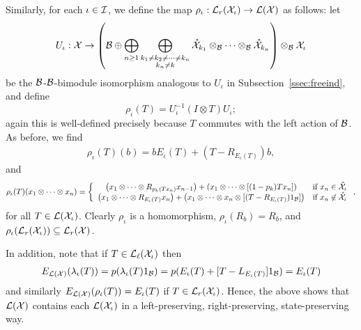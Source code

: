 \begin{construction}
	Similarly, for each $\iota \in \mathcal{I}$, we define the map $\rho_{\iota} : \mathcal{L}_r(\mathcal{X}_{\iota}) \to \mathcal{L}(\mathcal{X})$ as follows:
	let
	\[
		U_{\iota} : \mathcal{X} \to \left(\mathcal{B}\oplus\bigoplus_{n\geq1}\bigoplus_{\substack{k_1\neq k_2\neq\cdots\neq k_n\\ k_n \neq k}}
		\mathring{\mathcal{X}}_{k_1}\otimes_{\mathcal{B}}\cdots\otimes_{\mathcal{B}}\mathring{\mathcal{X}}_{k_n}\right) \otimes_{\mathcal{B}} \mathcal{X}_{\iota}
	\]
	be the $\mathcal{B}$-$\mathcal{B}$-bimodule isomorphism analogous to $U_\iota$ in Subsection~\ref{ssec:freeind}, and define
	\[
		\rho_{\iota}(T) = U_{\iota}^{-1}(I \otimes T)U_{\iota};
	\]
	again this is well-defined precisely because $T$ commutes with the left action of $\mathcal{B}$.
	As before, we find
	\begin{align*}
		\rho_{\iota}(T)(b) = b E_{\iota}(T) + (T-R_{E_{\iota}(T)}) b,
	\end{align*}
	and
	\begin{align*}
		\rho_{\iota}(T)(x_1\otimes\cdots \otimes x_n)=\left\{
			\begin{array}{cl}
				\left(x_1\otimes\cdots\otimes R_{p_{k}(T x_n)}x_{n-1}\right)
				+ \left(x_1\otimes\cdots \otimes [(1-p_{k})Tx_n]\right) & \text{if }x_n\in \mathring{\mathcal{X}}_{\iota}\\
				\left(x_1\otimes\cdots\otimes R_{E_{\iota}(T)}x_n\right)
				+ \left(x_1\otimes\cdots\otimes x_n\otimes [(T-R_{E_{\iota}(T)})1_{\mathcal{B}}]\right) & \text{if }x_n\not\in\mathring{\mathcal{X}}_{\iota}
		\end{array}\right.,
	\end{align*}
	for all $T \in \mathcal{L}(\mathcal{X}_{\iota})$.
	Clearly $\rho_{\iota}$ is a homomorphism, $\rho_{\iota}(R_b)=R_b$, and $\rho_{\iota}(\mathcal{L}_r(\mathcal{X}_{\iota})) \subseteq \mathcal{L}_r(\mathcal{X})$.




	In addition, note that if $T \in \mathcal{L}_\ell(\mathcal{X}_{\iota})$ then
	\begin{align*}
		E_{\mathcal{L}(\mathcal{X})}(\lambda_{\iota}(T))=p(\lambda_{\iota}(T)1_{\mathcal{B}})= p( E_{\iota}(T)+ [T-L_{E_{\iota}(T)}]1_{\mathcal{B}} ) = E_{\iota}(T)
	\end{align*}
	and similarly $E_{\mathcal{L}(\mathcal{X})}(\rho_{\iota}(T)) = E_{\iota}(T)$ if $T \in \mathcal{L}_r(\mathcal{X}_\iota)$.
	Hence, the above shows that $\mathcal{L}(\mathcal{X})$ contains each $\mathcal{L}(\mathcal{X}_{\iota})$ in a left-preserving, right-preserving, state-preserving way.
\end{construction}

